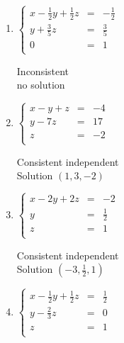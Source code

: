 \documentclass{ximera}
\begin{document}
\begin{enumerate}
Consistent independent\\
Solution $(1,3,-2)$



\item $\left\{ \begin{array}{rcr} x - \frac{1}{2} y + \frac{1}{2} z & = & -\frac{1}{2}  \\ [3pt] y + \frac{3}{5} z & = & \frac{3}{5} \\ 0 & = & 1 \\  \end{array} \right.$
 

Inconsistent\\
no solution




\item $\left\{ \begin{array}{rcr} x-y+z & = & -4  \\ y - 7z & = & 17 \\ z & = & -2 \\  \end{array} \right.$
 

Consistent independent\\
Solution $(1,3,-2)$


\item $\left\{ \begin{array}{rcr} x-2y+2z & = & -2  \\ y  & = & \frac{1}{2} \\ z & = & 1 \\  \end{array} \right.$
 

Consistent independent\\
Solution $\left(-3,\frac{1}{2},1\right)$


\item $\left\{ \begin{array}{rcr} x-\frac{1}{2} y+\frac{1}{2} z & = & \frac{1}{2}  \\ [3pt] y - \frac{2}{3} z & = & 0 \\ z & = & 1 \\  \end{array} \right.$
 


\end{enumerate}
\end{document}
